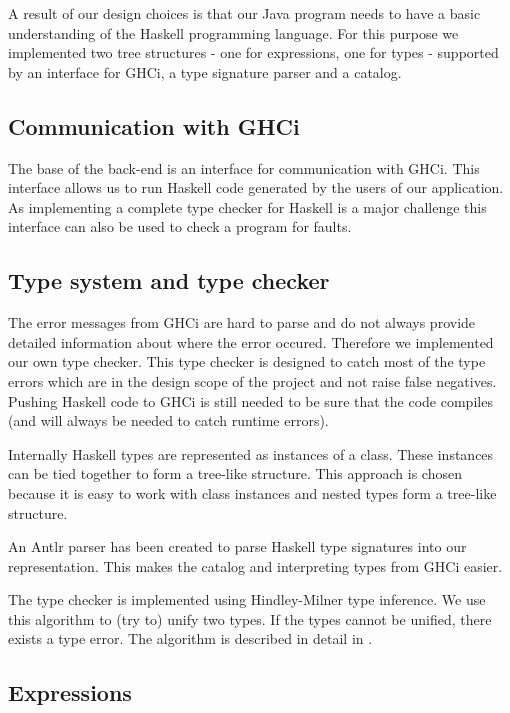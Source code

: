 A result of our design choices is that our Java program needs to have a basic understanding of the Haskell programming
language. For this purpose we implemented two tree structures - one for expressions, one for types - supported by an
interface for GHCi, a type signature parser and a catalog.

\subsection{Communication with GHCi}
\label{GHCi}

The base of the back-end is an interface for communication with GHCi. This interface allows us to run Haskell code
generated by the users of our application. As implementing a complete type checker for Haskell is a major challenge this
interface can also be used to check a program for faults.

\subsection{Type system and type checker}

The error messages from GHCi are hard to parse and do not always provide detailed information about where the error
occured. Therefore we implemented our own type checker. This type checker is designed to catch most of the type errors 
which are in the design scope of the project and not raise false negatives. Pushing Haskell code to GHCi is still needed
to be sure that the code compiles (and will always be needed to catch runtime errors).

Internally Haskell types are represented as instances of a class. These instances can be tied together to form a
tree-like structure. This approach is chosen because it is easy to work with class instances and nested types form
a tree-like structure. 

An Antlr parser has been created to parse Haskell type signatures into our representation. This makes the catalog and interpreting types from GHCi easier.

The type checker is implemented using Hindley-Milner type inference. We use this algorithm to (try to) unify two
types. If the types cannot be unified, there exists a type error. The algorithm is described in detail in
\cite{borisov}.  

\subsection{Expressions}

